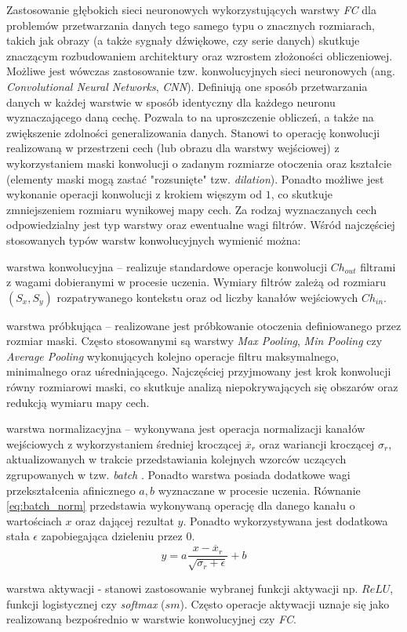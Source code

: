 Zastosowanie głębokich sieci neuronowych wykorzystujących warstwy \emph{FC} dla problemów przetwarzania danych tego samego typu o znacznych rozmiarach, takich jak obrazy (a także sygnały dźwiękowe, czy serie danych) skutkuje znaczącym rozbudowaniem architektury oraz wzrostem złożoności obliczeniowej. 
Możliwe jest wówczas zastosowanie tzw. konwolucyjnych sieci neuronowych (ang. \emph{Convolutional Neural Networks}, \emph{CNN}).
Definiują one sposób przetwarzania danych w każdej warstwie w sposób identyczny dla każdego neuronu wyznaczającego daną cechę.
Pozwala to na uproszczenie obliczeń, a także na zwiększenie zdolności generalizowania danych.
Stanowi to operację konwolucji realizowaną w przestrzeni cech (lub obrazu dla warstwy wejściowej) z wykorzystaniem maski konwolucji o zadanym rozmiarze otoczenia oraz kształcie (elementy maski mogą zastać "rozsunięte" tzw. \emph{dilation}). 
Ponadto możliwe jest wykonanie operacji konwolucji z krokiem więszym od $1$, co skutkuje zmniejszeniem rozmiaru wynikowej mapy cech.
Za rodzaj wyznaczanych cech odpowiedzialny jest typ warstwy oraz ewentualne wagi filtrów. 
Wśród najczęściej stosowanych typów warstw konwolucyjnych wymienić można:
\begin{description}
\item warstwa konwolucyjna -- realizuje standardowe operacje konwolucji $Ch_{out}$ filtrami z wagami dobieranymi w procesie uczenia. Wymiary filtrów zależą od rozmiaru $(S_x,S_y)$ rozpatrywanego kontekstu oraz od liczby kanałów wejściowych $Ch_{in}$. 
\item warstwa próbkująca -- realizowane jest próbkowanie otoczenia definiowanego przez rozmiar maski.
Często stosowanymi są warstwy \emph{Max Pooling}, \emph{Min Pooling} czy \emph{Average Pooling} wykonujących kolejno operacje filtru maksymalnego, minimalnego oraz uśredniającego. Najczęściej przyjmowany jest krok konwolucji równy rozmiarowi maski, co skutkuje analizą niepokrywających się obszarów oraz redukcją wymiaru mapy cech.
\item warstwa normalizacyjna -- wykonywana jest operacja normalizacji kanałów wejściowych z wykorzystaniem średniej kroczącej $\overline{x}_r$ oraz wariancji kroczącej $\sigma_r$, aktualizowanych w trakcie przedstawiania kolejnych wzorców uczących zgrupowanych w tzw. \emph{batch} .
Ponadto warstwa posiada dodatkowe wagi przekształcenia afinicznego $a, b$ wyznaczane w procesie uczenia.
Równanie \eqref{eq:batch_norm} przedstawia wykonywaną operację dla danego kanału o wartościach $x$ oraz dającej rezultat $y$. Ponadto wykorzystywana jest dodatkowa stała $\epsilon$ zapobiegająca dzieleniu przez $0$.  
\begin{equation}
y = a \frac{x-\overline{x}_r}{\sqrt{\sigma_r + \epsilon}} + b
\label{eq:batch_norm}
\end{equation}
\item warstwa aktywacji - stanowi zastosowanie wybranej funkcji aktywacji np. $ReLU$, funkcji logistycznej czy \emph{softmax} ($sm$).
Często operacje aktywacji uznaje się jako realizowaną bezpośrednio w warstwie konwolucyjnej czy \emph{FC}.
\end{description}
